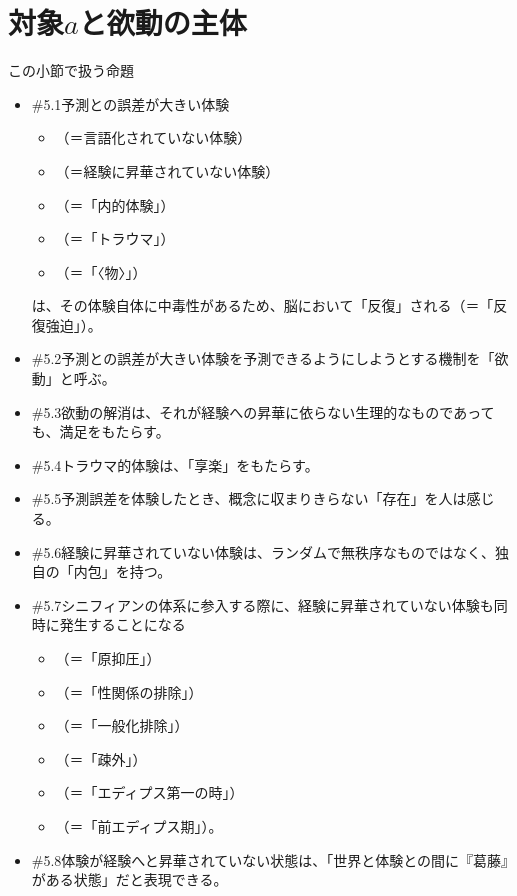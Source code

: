 \section{\texorpdfstring{対象\(a\)と欲動の主体}{対象aと欲動の主体}}\label{ux5bfeux8c61aux3068ux6b32ux52d5ux306eux4e3bux4f53}

\begin{note}{この小節で扱う命題}
  \begin{itemize}
    \tightlist
    \item{\#5.1}予測との誤差が大きい体験
      \begin{itemize}
        \tightlist
        \item （＝言語化されていない体験）
        \item （＝経験に昇華されていない体験）
        \item （＝「内的体験」）
        \item （＝「トラウマ」）
        \item （＝「〈物〉」）
      \end{itemize}は、その体験自体に中毒性があるため、脳において「反復」される（＝「反復強迫」）。
    \item{\#5.2}予測との誤差が大きい体験を予測できるようにしようとする機制を「欲動」と呼ぶ。
    \item{\#5.3}欲動の解消は、それが経験への昇華に依らない生理的なものであっても、満足をもたらす。
    \item{\#5.4}トラウマ的体験は、「享楽」をもたらす。
    \item{\#5.5}予測誤差を体験したとき、概念に収まりきらない「存在」を人は感じる。
    \item{\#5.6}経験に昇華されていない体験は、ランダムで無秩序なものではなく、独自の「内包」を持つ。
    \item{\#5.7}シニフィアンの体系に参入する際に、経験に昇華されていない体験も同時に発生することになる
      \begin{itemize}
        \tightlist
        \item （＝「原抑圧」）
        \item （＝「性関係の排除」）
        \item （＝「一般化排除」）
        \item （＝「疎外」）
        \item （＝「エディプス第一の時」）  
        \item （＝「前エディプス期」）。
      \end{itemize}
    \item{\#5.8}体験が経験へと昇華されていない状態は、「世界と体験との間に『葛藤』がある状態」だと表現できる。

\end{itemize}
\end{note}
